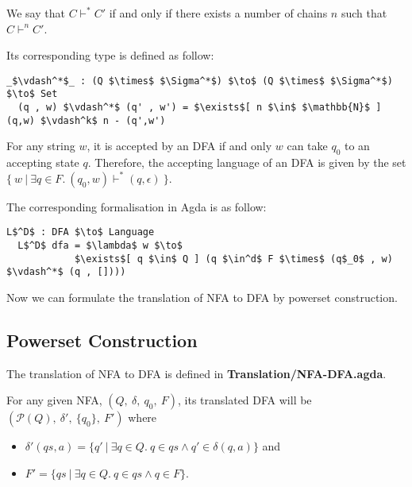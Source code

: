 \begin{defn}
\noindent We say that \(C \vdash^* C'\) if and only
if there exists a number of chains \(n\) such that \(C \vdash^n C'\). 
\end{defn}

\par Its corresponding type is defined as follow: 
\begin{lstlisting}[mathescape=true,xleftmargin=.3\textwidth]
  _$\vdash^*$_ : (Q $\times$ $\Sigma^*$) $\to$ (Q $\times$ $\Sigma^*$) $\to$ Set
  (q , w) $\vdash^*$ (q' , w') = $\exists$[ n $\in$ $\mathbb{N}$ ] (q,w) $\vdash^k$ n - (q',w')
\end{lstlisting}

\begin{defn}
\noindent For any string \(w\), it is accepted by an DFA
if and only \(w\) can take \(q_0\) to an accepting state \(q\). Therefore, the
accepting language of an DFA is given by the set \(\{\ w\ |\ \exists q\in F.\ (q_0,w) \vdash^* (q,\epsilon)\ \}\). 
\end{defn}

\par The corresponding formalisation in Agda is as follow: 
\begin{lstlisting}[mathescape=true,xleftmargin=.3\textwidth]
  L$^D$ : DFA $\to$ Language
  L$^D$ dfa = $\lambda$ w $\to$ 
            $\exists$[ q $\in$ Q ] (q $\in^d$ F $\times$ (q$_0$ , w) $\vdash^*$ (q , [])))
\end{lstlisting} 

\par Now we can formulate the translation of NFA to DFA
by powerset construction. 


\subsection{Powerset Construction}
\par The translation of NFA to DFA is defined in
\textbf{Translation/NFA-DFA.agda}. 

\begin{defn}
\label{defn:powerset}
\noindent For any given NFA, \((Q,\ \delta,\ q_0,\ F)\), its
translated DFA will be \((\mathcal P \left({Q}\right),\ \delta',\ \{q_0\},\ F')\) where
\begin{itemize}[nolistsep]
  \item \(\delta'(qs,a) = \{q'\ |\ \exists q\in Q.\ q \in qs \wedge q'
    \in \delta (q,a)\}\) and 
  \item \(F' = \{qs\ |\ \exists q\in Q.\ q \in qs \wedge q \in F\}\). 
\end{itemize}
\end{defn}

